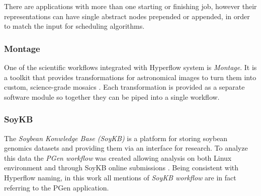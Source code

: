 There are applications with more than one starting or finishing job, however their representations can have single abstract nodes prepended or appended, in order to match the input for scheduling algorithms.



\subsubsection{Montage}

One of the scientific workflows integrated with Hyperflow system is \emph{Montage}.
It is a toolkit that provides transformations for astronomical images to turn them into custom, science-grade mosaics \cite{b:Montage-url}.
Each transformation is provided as a separate software module \cite{b:Montage} so together they can be piped into a single workflow.



\subsubsection{SoyKB}

The \emph{Soybean Konwledge Base (SoyKB)} is a platform for storing soybean genomics datasets and providing them via an interface for research.
To analyze this data the \emph{PGen workflow} was created allowing analysis on both Linux environment and through SoyKB online submissions \cite{b:SoyKB-workflow-url, b:SoyKB-PGen}.
Being consistent with Hyperflow naming, in this work all mentions of \emph{SoyKB workflow} are in fact referring to the PGen application.



